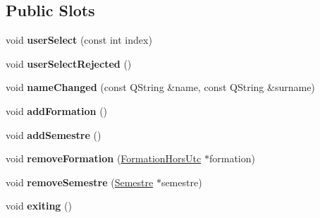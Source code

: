 \subsection*{Public Slots}
\begin{DoxyCompactItemize}
\item 
\hypertarget{classMainWindowController_abc59d49d0b3a28567709eea4f6c235b0}{void {\bfseries user\+Select} (const int index)}\label{classMainWindowController_abc59d49d0b3a28567709eea4f6c235b0}

\item 
\hypertarget{classMainWindowController_af706e644d430a17b28751b4b68d7e098}{void {\bfseries user\+Select\+Rejected} ()}\label{classMainWindowController_af706e644d430a17b28751b4b68d7e098}

\item 
\hypertarget{classMainWindowController_a8f8eb0a351a447ef76289140cfebbec2}{void {\bfseries name\+Changed} (const Q\+String \&name, const Q\+String \&surname)}\label{classMainWindowController_a8f8eb0a351a447ef76289140cfebbec2}

\item 
\hypertarget{classMainWindowController_a839f58b4aa76126f41e79e58d83814a7}{void {\bfseries add\+Formation} ()}\label{classMainWindowController_a839f58b4aa76126f41e79e58d83814a7}

\item 
\hypertarget{classMainWindowController_a5e87d3e09120071039146bdc20939d03}{void {\bfseries add\+Semestre} ()}\label{classMainWindowController_a5e87d3e09120071039146bdc20939d03}

\item 
\hypertarget{classMainWindowController_af447b7baea272507e216431c821b3e9c}{void {\bfseries remove\+Formation} (\hyperlink{classFormationHorsUtc}{Formation\+Hors\+Utc} $\ast$formation)}\label{classMainWindowController_af447b7baea272507e216431c821b3e9c}

\item 
\hypertarget{classMainWindowController_afa1bdec4bbb04d6413574603e08fffb9}{void {\bfseries remove\+Semestre} (\hyperlink{classSemestre}{Semestre} $\ast$semestre)}\label{classMainWindowController_afa1bdec4bbb04d6413574603e08fffb9}

\item 
\hypertarget{classMainWindowController_a656ad663043162f57664135f87f3524b}{void {\bfseries exiting} ()}\label{classMainWindowController_a656ad663043162f57664135f87f3524b}

\end{DoxyCompactItemize}
